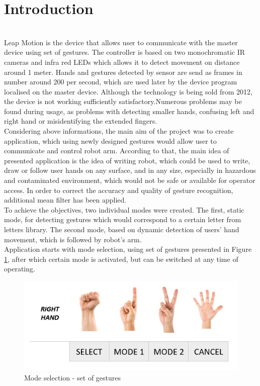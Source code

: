 \section{Introduction}

\mbox{}\\

Leap Motion is the device that allows user to communicate with the master device using set of gestures. The controller is based on two monochromatic IR cameras and infra red LEDs which allows it to detect movement on distance around 1 meter. Hands and gestures detected by sensor are send as frames in number around 200 per second, which are used later by the device program localised on the master device. Although the technology is being sold from 2012, the device is not working sufficiently satisfactory.Numerous problems may be found during usage, as problems with detecting smaller hands, confusing left and right hand or misidentifying the extended fingers. \\

Considering above informations, the main aim of the project was to create application, which using newly designed gestures would allow user to communicate and control robot arm. According to that, the main idea of presented application is the idea of writing robot, which could be used to write, draw or follow user hands on any surface, and in any size, especially in hazardous and contaminated environment, which would not be safe or available for operator access. In order to correct the accuracy and quality of gesture recognition, additional mean filter has been applied.\\

To achieve the objectives, two individual modes were created. The first, static mode, for detecting gestures which would correspond 
to a certain letter from letters library. The second mode, based on dynamic detection of users' hand movement, which is followed by robot's arm. \\

Application starts with mode selection, using set of gestures presented in Figure \ref{fig:mode}, after which certain mode is activated, but can be switched at any time of operating. 


\begin{figure}[H]
	\includegraphics{mode_selection}
	\centering
	\caption{Mode selection - set of gestures}
	\label{fig:mode}
\end{figure}


